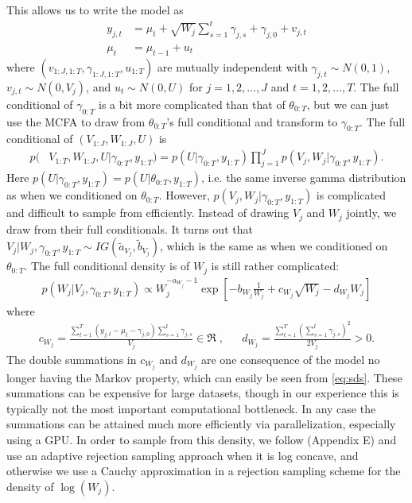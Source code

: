 \documentclass[graybox]{svmult}
\begin{document}
This allows us to write the model as
\begin{align}
y_{j,t} & = \mu_t + \sqrt{W_j}\sum_{s=1}^t\gamma_{j,s} + \gamma_{j,0} + v_{j,t}\nonumber\\
\mu_t & = \mu_{t-1} + u_t\label{eq:sds}
\end{align}
where $(v_{1:J,1:T},\gamma_{1:J,1:T},u_{1:T})$ are mutually independent with $\gamma_{j,t}\sim N(0,1)$, $v_{j,t}\sim N(0,V_j)$, and $u_t\sim N(0,U)$ for $j=1,2,\dots,J$ and $t=1,2,\dots,T$. The full conditional of $\gamma_{0:T}$ is a bit more complicated than that of $\theta_{0:T}$, but we can just use the MCFA to draw from $\theta_{0:T}$'s full conditional and transform to $\gamma_{0:T}$. The full conditional of $(V_{1:J},W_{1:J},U)$ is 
\begin{align*}
p(&V_{1:T},W_{1:J},U|\gamma_{0:T},y_{1:T})=p(U|\gamma_{0:T},y_{1:T})\prod_{j=1}^Jp(V_j,W_j|\gamma_{0:T},y_{1:T}).
\end{align*}
Here $p(U|\gamma_{0:T},y_{1:T})=p(U|\theta_{0:T},y_{1:T})$, i.e. the same inverse gamma distribution as when we conditioned on $\theta_{0:T}$. However, $p(V_j,W_j|\gamma_{0:T},y_{1:T})$ is complicated and difficult to sample from efficiently. Instead of drawing $V_j$ and $W_j$ jointly, we draw from their full conditionals. It turns out that $V_j|W_j,\gamma_{0:T},y_{1:T} \sim IG(\tilde{a}_{V_j},\tilde{b}_{V_j})$, which is the same as when we conditioned on $\theta_{0:T}$. The full conditional density is of $W_j$ is still rather complicated:
\begin{align*}
p(W_j|V_j,\gamma_{0:T},y_{1:T}) \propto W_j^{-a_{W_j}-1}\exp\left[-b_{W_j}\frac{1}{W_j} + c_{W_j}\sqrt{W_j} - d_{W_j}W_j\right]
\end{align*}
where
\begin{align*}
c_{W_j}=\frac{\sum_{t=1}^T(y_{j,t} - \mu_t - \gamma_{j,0})\sum_{s=1}^t\gamma_{j,s}}{V_j}\in\Re\;,&&d_{W_j} = \frac{\sum_{t=1}^T\left(\sum_{s=1}^t\gamma_{j,s}\right)^2}{2V_j} >0.
\end{align*}
The double summations in $c_{W_j}$ and $d_{W_j}$ are one consequence of the model no longer having the Markov property, which can easily be seen from \eqref{eq:sds}. These summations can be expensive for large datasets, though in our experience this is typically not the most important computational bottleneck. In any case the summations can be attained much more efficiently via parallelization, especially using a GPU. In order to sample from this density, we follow \cite{simpson2014interweaving} (Appendix E) and use an adaptive rejection sampling approach \citep{gilks1992adaptive} when it is log concave, and otherwise we use a Cauchy approximation in a rejection sampling scheme for the density of $\log(W_j)$.
\end{document}
